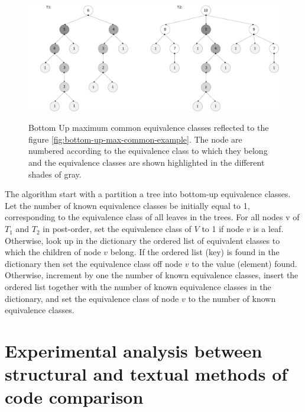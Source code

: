 \documentclass{report}
\begin{document}
\begin{figure}[h]
  \centering
  \includegraphics[scale=0.45]{Figures/algorithms/BU/bottom-up-max-common-example-equivalence.pdf}\\[0.1cm]
  \caption[Bottom Up maximum common equivalence classes for figure.] { Bottom Up maximum common equivalence classes reflected to the figure \ref{fig:bottom-up-max-common-example}. The node are numbered according to the equivalence class to which they belong and the equivalence classes are shown highlighted in the different shades of gray\cite{valiente}.}
  \label{fig:bottom-up-max-common-example-equivalence}
\end{figure}

The algorithm start with a partition a tree into bottom-up equivalence classes.
Let the number of known equivalence classes be initially equal to 1, corresponding to the equivalence class of all leaves in the trees. For all nodes v of $ T_{1}$ and $ T_{2 }$ in post-order, set the equivalence class of $V$ to 1 if node $v$ is a leaf. Otherwise, look up in the dictionary the ordered list of equivalent classes to which the children of node $v$ belong. If the ordered list (key) is found in the dictionary then set the equivalence class off node $v$ to the value (element) found. Otherwise, increment by one the number of known equivalence classes, insert the ordered list together with the number of known equivalence classes in the dictionary, and set the equivalence class of node $v$ to the number of known equivalence classes.


\chapter{Experimental analysis between structural and textual methods of code comparison}
\label{cha:experimental}
\end{document}
